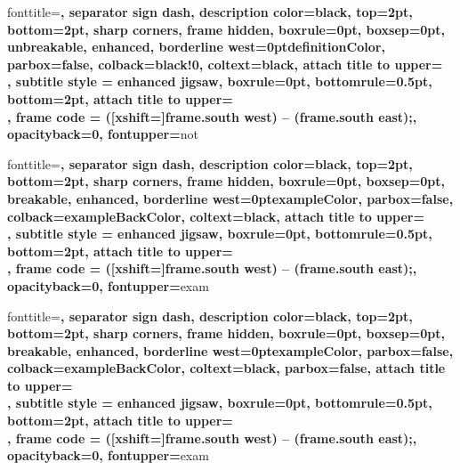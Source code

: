     {\begin{tcbdef}{#1}{#2}}{\end{tcbdef}}
%
     {fonttitle=\sffamily\bfseries\color{definitionColor},
      separator sign dash, description color=black,
      top=2pt, bottom=2pt,
      sharp corners,
      frame hidden, boxrule=0pt, boxsep=0pt, unbreakable,
      enhanced, borderline west={\the\tcbBorderWidth}{0pt}{definitionColor},
      parbox=false,
      colback=black!0,
      coltext=black,
      attach title to upper={\\},
      subtitle style = {enhanced jigsaw, boxrule=0pt, bottomrule=0.5pt, bottom=2pt,
      attach title to upper={\\},
      frame code = { ([xshift=\the\tcbBorderWidth]frame.south west) -- (frame.south east);},
      opacityback=0, fontupper=\color{black}}}{not}
    {\begin{tcbnotation*}{#1}{#2}}{\end{tcbnotation*}}
%
     {fonttitle=\sffamily\bfseries\color{exampleColor},
      separator sign dash, description color=black,
      top=2pt, bottom=2pt,
      sharp corners,
      frame hidden, boxrule=0pt, boxsep=0pt, breakable,
      enhanced, borderline west={\the\tcbBorderWidth}{0pt}{exampleColor},
      parbox=false,
      colback=exampleBackColor,
      coltext=black,
      attach title to upper={\\},
      subtitle style = {enhanced jigsaw, boxrule=0pt, bottomrule=0.5pt, bottom=2pt,
      attach title to upper={\\},
      frame code = { ([xshift=\the\tcbBorderWidth]frame.south west) -- (frame.south east);}, 
      opacityback=0, fontupper=\color{black}}}{exam}
    {\begin{tcbexample}{#1}{#2}}{\end{tcbexample}}
%
     {fonttitle=\sffamily\bfseries\color{exampleColor},
      separator sign dash, description color=black,
      top=2pt, bottom=2pt,
      sharp corners,
      frame hidden, boxrule=0pt, boxsep=0pt, breakable,
      enhanced, borderline west={\the\tcbBorderWidth}{0pt}{exampleColor},
      parbox=false,
      colback=exampleBackColor,
      coltext=black,
      parbox=false,
      attach title to upper={\\},
      subtitle style = {enhanced jigsaw, boxrule=0pt, bottomrule=0.5pt, bottom=2pt,
      attach title to upper={\\},
      frame code = { ([xshift=\the\tcbBorderWidth]frame.south west) -- (frame.south east);}, 
      opacityback=0, fontupper=\color{black}}}{exam}
